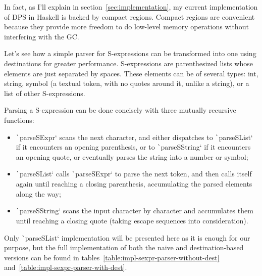 \documentclass[english]{jflart}
\begin{document}
In fact, as I'll explain in section~\ref{sec:implementation}, my current implementation of DPS in Haskell is backed by compact regions. Compact regions are convenient because they provide more freedom to do low-level memory operations without interfering with the GC.

Let's see how a simple parser for S-expressions can be transformed into one using destinations for greater performance. S-expressions are parenthesized lists whose elements are just separated by spaces. These elements can be of several types: int, string, symbol (a textual token, with no quotes around it, unlike a string), or a list of other S-expressions.

Parsing a S-expression can be done concisely with three mutually recursive functions:
\begin{itemize}
  \item \texttt`parseSExpr` scans the next character, and either dispatches to \texttt`parseSList` if it encounters an opening parenthesis, or to \texttt`parseSString` if it encounters an opening quote, or eventually parses the string into a number or symbol;
  \item \texttt`parseSList` calls \texttt`parseSExpr` to parse the next token, and then calls itself again until reaching a closing parenthesis, accumulating the parsed elements along the way;
  \item \texttt`parseSString` scans the input character by character and accumulates them until reaching a closing quote (taking escape sequences into consideration).
\end{itemize}

Only \texttt`parseSList` implementation will be presented here as it is enough for our purpose, but the full implementation of both the naive and destination-based versions can be found in tables~\ref{table:impl-sexpr-parser-without-dest} and~\ref{table:impl-sexpr-parser-with-dest}.
\end{document}
